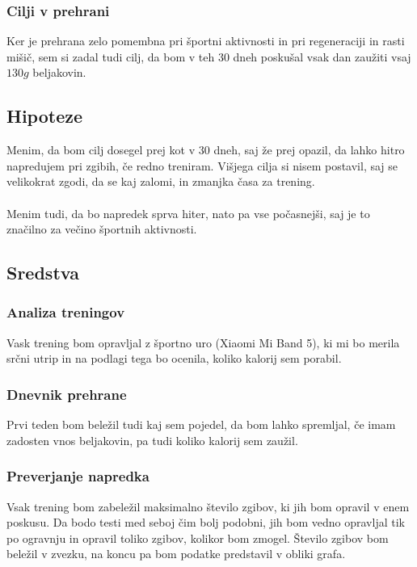 \documentclass{article}
\begin{document}
\subsubsection{Cilji v prehrani}
Ker je prehrana zelo pomembna pri športni aktivnosti in pri regeneraciji in rasti mišič, sem si zadal tudi cilj, da bom v teh 30 dneh poskušal vsak dan zaužiti vsaj $130g$ beljakovin.

\subsection{Hipoteze}

Menim, da bom cilj dosegel prej kot v 30 dneh, saj že prej opazil, da lahko hitro napredujem pri zgibih, če redno treniram. Višjega cilja si nisem postavil, saj se velikokrat zgodi, da se kaj zalomi, in zmanjka časa za trening.
\paragraph{}
Menim tudi, da bo napredek sprva hiter, nato pa vse počasnejši, saj je to značilno za večino športnih aktivnosti.

\subsection{Sredstva}

\subsubsection{Analiza treningov}
Vask trening bom opravljal z športno uro (Xiaomi Mi Band 5), ki mi bo merila srčni utrip in na podlagi tega bo ocenila, koliko kalorij sem porabil.

\subsubsection{Dnevnik prehrane}
Prvi teden bom beležil tudi kaj sem pojedel, da bom lahko spremljal, če imam zadosten vnos beljakovin, pa tudi koliko kalorij sem zaužil.

\subsubsection{Preverjanje napredka}
Vsak trening bom zabeležil maksimalno število zgibov, ki jih bom opravil v enem poskusu. Da bodo testi med seboj čim bolj podobni, jih bom vedno opravljal tik po ogravnju in opravil toliko zgibov, kolikor bom zmogel. Število zgibov bom beležil v zvezku, na koncu pa bom podatke predstavil v obliki grafa.
\end{document}
